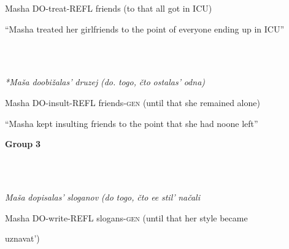 \documentclass[output=paper,modfonts, nonflat]{langsci/langscibook}
\begin{document}
\begin{styleinnerExample}
    Masha DO-treat-REFL friends (to that          all  got      in ICU)
\end{styleinnerExample}

\begin{styleinnerExample}
  “Masha treated her girlfriends to the point of everyone ending up in ICU”
\end{styleinnerExample}

\begin{styleinnerExample}
\ea%
    \label{ex:key:32}
    \gll\\
        \\
    \glt
    \z

        
\end{styleinnerExample}

\begin{styleinnerExample}
  \textit{*Maša}   \textit{doobižalas’}         \textit{druzej}            \textit{(do.}   \textit{togo,} \textit{čto} \textit{ostalas’}   \textit{odna)}
\end{styleinnerExample}

\begin{styleinnerExample}
     Masha DO-insult-REFL friends-\textsc{gen}   (until that   she remained alone)
\end{styleinnerExample}

\begin{styleinnerExample}
  “Masha kept insulting friends to the point that she had noone left”
\end{styleinnerExample}

\textbf{Group} \textbf{3}

\begin{styleinnerExample}
\ea%
    \label{ex:key:33}
    \gll\\
        \\
    \glt
    \z

          \textit{Maša}   \textit{dopisalas’}            \textit{sloganov}       \textit{(do}     \textit{togo,} \textit{čto} \textit{ee} \textit{stil’} \textit{načali} 
\end{styleinnerExample}

\begin{styleinnerExample}
  Masha DO-write-REFL  slogans-\textsc{gen}  (until that   her     style became 
\end{styleinnerExample}

\begin{styleinnerExample}
  uznavat’)
\end{styleinnerExample}
\end{document}

